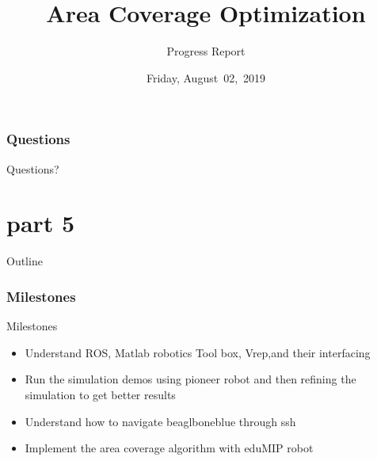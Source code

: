 \documentclass{beamer}
\begin{document}
\section*{Questions}
\begin{frame}
\begin{LARGE}
\begin{center}
Questions?
\end{center}
\end{LARGE}
\end{frame}
\part{part 5}
\title{Area Coverage Optimization}
\subtitle{Progress Report}
\date[July~19,~2019]{Friday, August~02,~2019}
\begin{frame}
\maketitle
\end{frame}
\begin{frame}{Outline}
  \tableofcontents
  \end{frame}
\section{Milestones}
\begin{frame}{Milestones}
\begin{center}
\begin{itemize}
 \item Understand ROS, Matlab robotics Tool box, Vrep,and their interfacing 
 \item Run the simulation demos using pioneer robot and then refining the simulation to get better results 
 \item Understand how to navigate beaglboneblue through ssh
 \item Implement the area coverage algorithm with eduMIP robot
\end{itemize}
\end{center}
\end{frame}
\end{document}
